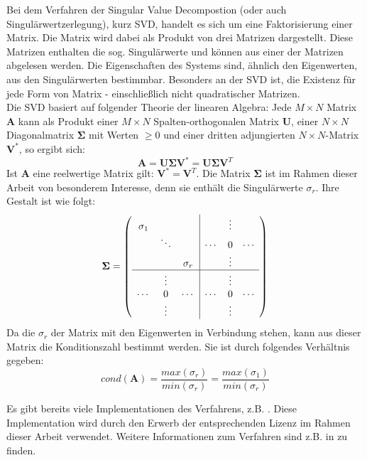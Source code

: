 Bei dem Verfahren der Singular Value Decompostion (oder auch Singulärwertzerlegung), kurz SVD, handelt es sich um eine Faktorisierung einer Matrix. Die Matrix wird dabei als Produkt von drei Matrizen dargestellt. Diese Matrizen enthalten die sog. Singulärwerte und können aus einer der Matrizen abgelesen werden. Die Eigenschaften des Systems sind, ähnlich den Eigenwerten, aus den Singulärwerten bestimmbar. Besonders an der SVD ist, die Existenz für jede Form von Matrix - einschließlich nicht quadratischer Matrizen.\\
Die SVD basiert auf folgender Theorie der linearen Algebra: Jede $M \times N$ Matrix $\mathbf{A}$ kann als Produkt einer $M \times N$ Spalten-orthogonalen Matrix $\mathbf{U}$, einer $N \times N$ Diagonalmatrix $\mathbf{\Sigma}$ mit Werten $\geq 0$ und einer dritten adjungierten $N \times N$-Matrix $\mathbf{V^*}$, so ergibt sich:
%
\begin{equation}
\mathbf{A}= \mathbf{U \Sigma V^*} = \mathbf{U \Sigma V}^T
\end{equation}
Ist $\mathbf{A}$ eine reelwertige Matrix gilt: $ \mathbf{V^*} = \mathbf{V}^T $. Die Matrix $\mathbf{ \Sigma }$ ist im Rahmen dieser Arbeit von besonderem Interesse, denn sie enthält die Singulärwerte $\sigma_r$. Ihre Gestalt ist wie folgt:
%
\begin{equation}
	\mathbf{\Sigma} = \left(\begin{array}{ccc|ccc}
	\sigma_1 &          &          &        & \vdots &        \\
	         & \ddots   &          & \cdots & 0      & \cdots \\
	         &          & \sigma_r &        & \vdots &        \\
	\hline
	         &  \vdots  &          &        & \vdots &        \\
	\cdots   &  0       & \cdots   & \cdots & 0      & \cdots \\
	         &  \vdots  &          &        & \vdots &        \\
	
	\end{array}\right)\nonumber
\end{equation}
%
%
Da die $\sigma_r$ der Matrix mit den Eigenwerten in Verbindung stehen, kann aus dieser Matrix die Konditionszahl bestimmt werden. Sie ist durch folgendes Verhältnis gegeben: 
\begin{equation}
	\label{eq:cond_from_svd}
	cond(\mathbf{A})=\frac{max(\sigma_r)}{min(\sigma_r)}=\frac{max(\sigma_1)}{min(\sigma_r)}
\end{equation} 

Es gibt bereits viele Implementationen des Verfahrens, z.B. \cite{press2007numerical}. Diese Implementation wird durch den Erwerb der entsprechenden Lizenz im Rahmen dieser Arbeit verwendet. Weitere Informationen zum Verfahren sind z.B. in \cite[Kaptiel 4.6.3]{bronstejn2012taschenbuch} zu finden.
